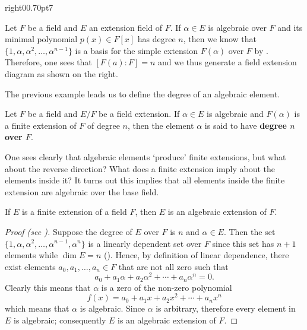 \begin{examplewithcutout}{right}{0}{0.7\textwidth}{0pt}{7}{
    \begin{figure}[H]
        \centering
    \end{figure}
}
    Let $F$ be a field and $E$ an extension field of $F$. If $\alpha \in E$ is algebraic over $F$ and its minimal polynomial $p(x) \in F[x]$ has degree $n$, then we know that $\{1, \alpha, \alpha^2, \dots, \alpha^{n-1}\}$ is a basis for the simple extension $F(\alpha)$ over $F$ by . Therefore, one sees that $[F(a): F] = n$ and we thus generate a field extension diagram as shown on the right.
\end{examplewithcutout}

The previous example leads us to define the degree of an algebraic element.

\begin{definition}
    Let $F$ be a field and $E/F$ be a field extension. If $\alpha \in E$ is algebraic and $F(\alpha)$ is a finite extension of $F$ of degree $n$, then the element $\alpha$ is said to have \textbf{degree $n$ over $F$}.
\end{definition}

One sees clearly that algebraic elements `produce' finite extensions, but what about the reverse direction? What does a finite extension imply about the elements inside it? It turns out this implies that all elements inside the finite extension are algebraic over the base field.

\begin{theorem}\label{thrm-finite-extension-is-algebraic}
    If $E$ is a finite extension of a field $F$, then $E$ is an algebraic extension of $F$.
\end{theorem}
\begin{proof}[Proof (see {\cite[Theorem 21.4]{gallian_2016}})]
    Suppose the degree of $E$ over $F$ is $n$ and $\alpha \in E$. Then the set $\{1, \alpha, \alpha^2, \dots, \alpha^{n-1}, \alpha^n\}$ is a linearly dependent set over $F$ since this set has $n + 1$ elements while $\dim E = n$ (). Hence, by definition of linear dependence, there exist elements $a_0, a_1, \dots, a_n \in F$ that are not all zero such that
    \[
        a_0 + a_1\alpha + a_2\alpha^2 + \cdots + a_n\alpha^n = 0.
    \]
    Clearly this means that $\alpha$ is a zero of the non-zero polynomial
    \[
        f(x) = a_0 + a_1x + a_2x^2 + \cdots + a_nx^n
    \]
    which means that $\alpha$ is algebraic. Since $\alpha$ is arbitrary, therefore every element in $E$ is algebraic; consequently $E$ is an algebraic extension of $F$.
\end{proof}

